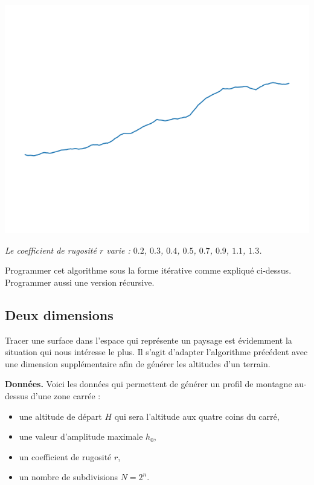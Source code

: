 \documentclass[11pt,class=report,crop=false]{standalone}
\begin{document}
\begin{exemple}
\begin{center}
\includegraphics[scale=\myscale,scale=0.2]{figures/landscape-06-13}

\nopagebreak

\begin{minipage}{0.8\textwidth}
\center\emph{
Le coefficient de rugosité $r$ varie : $0.2$, $0.3$, $0.4$, $0.5$, $0.7$, $0.9$, $1.1$, $1.3$.}
\end{minipage}

\end{center}

\end{exemple}


\begin{exercicecours}
Programmer cet algorithme sous la forme itérative comme expliqué ci-dessus. Programmer aussi une version récursive.
\end{exercicecours}

\subsection{Deux dimensions}

Tracer une surface dans l'espace qui représente un paysage est évidemment la situation qui nous intéresse le plus. Il s'agit d'adapter l'algorithme précédent avec une dimension supplémentaire afin de générer les altitudes d'un terrain.


\textbf{Données.} 
Voici les données qui permettent de générer un profil de montagne au-dessus d'une zone carrée :

\begin{itemize}
  \item une altitude de départ $H$ qui sera l'altitude aux quatre coins du carré,
  \item une valeur d'amplitude maximale $h_0$,
  \item un coefficient de rugosité $r$,
  \item un nombre de subdivisions $N = 2^n$.
\end{itemize}
\medskip
\end{document}
